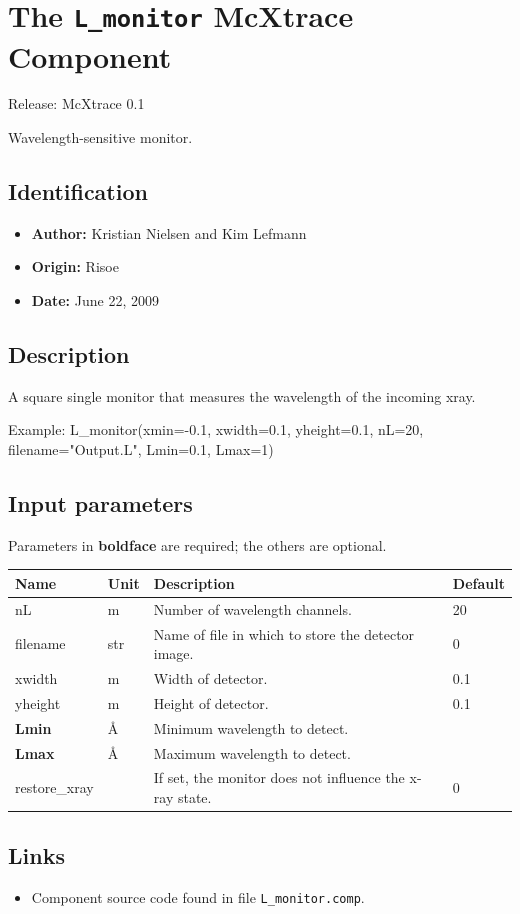 \section{The \texttt{L\_monitor} McXtrace Component}
Release: McXtrace 0.1

Wavelength-sensitive monitor.

\subsection*{Identification}
\begin{itemize}
  \item \textbf{Author:} Kristian Nielsen and Kim Lefmann
  \item \textbf{Origin:} Risoe
  \item \textbf{Date:} June 22, 2009
\end{itemize}

\subsection*{Description}
A square single monitor that measures the wavelength of the incoming xray.

Example: L\_monitor(xmin=-0.1, xwidth=0.1, yheight=0.1, nL=20, filename="Output.L", Lmin=0.1, Lmax=1)

\subsection*{Input parameters}
Parameters in \textbf{boldface} are required; the others are optional.

\begin{longtable}{p{}p{}p{}p{}}
\toprule
\textbf{Name} & \textbf{Unit} & \textbf{Description} & \textbf{Default} \\
\midrule
\endhead
nL & m & Number of wavelength channels. & 20 \\
filename & str & Name of file in which to store the detector image. & 0 \\
xwidth & m & Width of detector. & 0.1 \\
yheight & m & Height of detector. & 0.1 \\
\textbf{Lmin} & \AA{} & Minimum wavelength to detect. &  \\
\textbf{Lmax} & \AA{} & Maximum wavelength to detect. &  \\
restore\_xray &   & If set, the monitor does not influence the x-ray state. & 0 \\
\bottomrule
\end{longtable}

\subsection*{Links}
\begin{itemize}
  \item Component source code found in file \texttt{L\_monitor.comp}.
\end{itemize}
